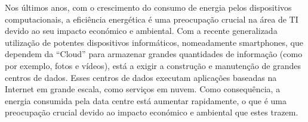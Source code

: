 
\begin{comment}
Independentemente da língua em que está escrita a dissertação, é necessário um resumo na língua do texto principal e um resumo noutra língua.  Assume-se que as duas línguas em questão serão sempre o Português e o Inglês.

O \emph{template} colocará automaticamente em primeiro lugar o resumo na língua do texto principal e depois o resumo na outra língua.  Por exemplo, se a dissertação está escrita em Português, primeiro aparecerá o resumo em Português, depois em Inglês, seguido do texto principal em Português. Se a dissertação está escrita em Inglês, primeiro aparecerá o resumo em Inglês, depois em Português, seguido do texto principal em Inglês.

O resumo não deve exceder uma página e deve responder às seguintes questões:
\begin{itemize}
	\item Qual é o problema?
	\item Porque é que ele é interessante?
	\item Qual é a solução?
	\item O que resulta (implicações) da solução?
\end{itemize}

E agora vamos fazer um teste com uma quebra de linha no hífen a ver se a \LaTeX\ duplica o hífen na linha seguinte…

zzzz zzz zzzz zzz zzzz zzz zzzz zzz zzzz zzz zzzz zzz zzzz zzz zzzz zzz zzzz comentar"-lhe zzz zzzz zzz zzzz 

Sim!  Funciona! :)
\end{comment}
Nos últimos anos, com o crescimento do consumo de energia pelos dispositivos computacionais, a eficiência energética é uma preocupação crucial na área de TI devido ao seu impacto económico e ambiental. Com a recente generalizada utilização de potentes dispositivos informáticos, nomeadamente smartphones, que dependem da “Cloud” para armazenar grandes quantidades de informação (como por exemplo, fotos e vídeos), está a exigir a construção e manutenção de grandes centros de dados. Esses centros de dados executam aplicações baseadas na Internet em grande escala, como serviços em nuvem. Como consequência, a energia consumida pela data centre está aumentar rapidamente, o que é uma preocupação crucial devido ao impacto económico e ambiental que estes trazem.

